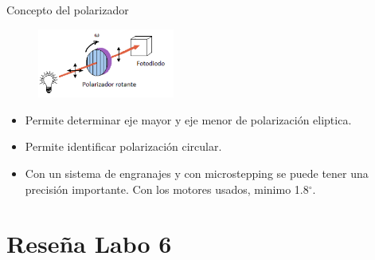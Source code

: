 \begin{frame}[fragile]{Concepto del polarizador}

\begin{figure}[H]
\centering
\includegraphics[width=0.4\textwidth]{fig/polarimetro/esquema}
\label{fig:polarimetro}
\end{figure}
\begin{itemize}
\item Permite determinar eje mayor y eje menor de polarización eliptica. 
\item Permite identificar polarización circular.
\item Con un sistema de engranajes y con microstepping se puede tener una precisión importante. Con los motores usados, minimo 1.8$^\circ$.
\end{itemize}


\end{frame}

\section{Reseña Labo 6}

